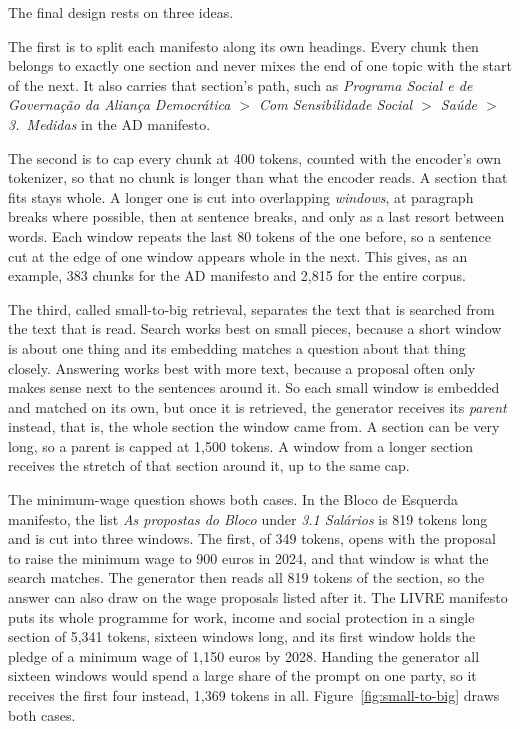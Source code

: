The final design rests on three ideas.

The first is to split each manifesto along its own headings. Every chunk then
belongs to exactly one section and never mixes the end of one topic with the
start of the next. It also carries that section's path, such as
\textit{Programa Social e de Governação da Aliança Democrática $>$ Com
Sensibilidade Social $>$ Saúde $>$ 3.~Medidas} in the AD manifesto.

The second is to cap every chunk at 400 tokens, counted with the encoder's
own tokenizer, so that no chunk is longer than what the encoder reads. A
section that fits stays whole. A longer one is cut into overlapping
\emph{windows}, at paragraph breaks where possible, then at sentence breaks,
and only as a last resort between words. Each window repeats the last 80
tokens of the one before, so a sentence cut at the edge of one window appears
whole in the next. This gives, as an example, 383 chunks for the AD manifesto
and 2{,}815 for the entire corpus.

The third, called small-to-big retrieval, separates the text that is
searched from the text that is read. Search works best on small pieces,
because a short window is about one thing and its embedding matches a
question about that thing closely. Answering works best with more text,
because a proposal often only makes sense next to the sentences around it. So
each small window is embedded and matched on its own, but once it is
retrieved, the generator receives its \emph{parent} instead, that is, the whole section
the window came from. A section can be very long, so a parent is capped at
1{,}500 tokens. A window from a longer section receives the stretch of that
section around it, up to the same cap.

The minimum-wage question shows both cases. In the Bloco de Esquerda
manifesto, the list \textit{As propostas do Bloco} under \textit{3.1 Salários}
is 819 tokens long and is cut into three windows. The first, of 349 tokens,
opens with the proposal to raise the minimum wage to 900 euros in 2024, and
that window is what the search matches. The generator then reads all 819
tokens of the section, so the answer can also draw on the wage proposals
listed after it. The LIVRE manifesto puts its whole programme for work,
income and social protection in a single section of 5{,}341 tokens, sixteen
windows long, and its first window holds the pledge of a minimum wage of
1{,}150 euros by 2028. Handing the generator all sixteen windows would spend
a large share of the prompt on one party, so it receives the first four
instead, 1{,}369 tokens in all. Figure~\ref{fig:small-to-big} draws both
cases.

